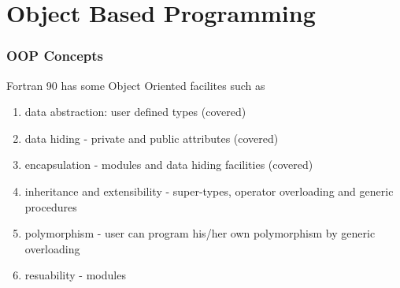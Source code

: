 \documentclass[slidestop,mathserif,compress,xcolor=svgnames]{beamer}
\begin{document}
\section{Object Based Programming}
\begin{frame}
  \frametitle{\small OOP Concepts}
  \begin{block}{\scriptsize Fortran 90 has some Object Oriented facilites such as}
    \begin{enumerate}
      \item data abstraction: user defined types (covered)
      \item data hiding - private and public attributes (covered)
      \item encapsulation - modules and data hiding facilities (covered)
      \item inheritance and extensibility - super-types, operator overloading and generic procedures
      \item polymorphism - user can program his/her own polymorphism by generic overloading
      \item resuability - modules
    \end{enumerate}
  \end{block}
\end{frame}
\end{document}
